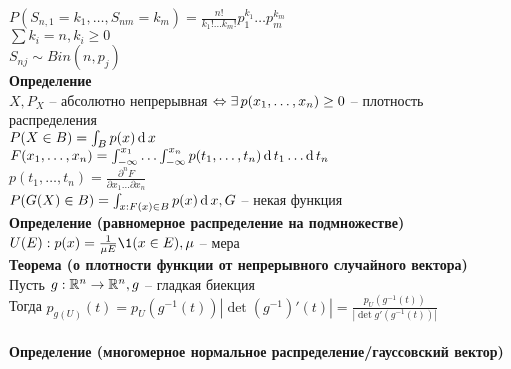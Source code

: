 \documentclass[12pt]{article}
\begin{document}
$P(S_{n,1}=k_1,\ldots, S_{nm}=k_m) = \frac{n!}{k_1!\ldots k_m!}p_1^{k_1}\ldots p_m^{k_m}$\\
$\sum k_i = n, k_i \geq 0$\\
$S_{nj} \sim Bin(n, p_j)$\\
\textbf{Определение}\\
$X, P_X$ -- абсолютно непрерывная $\Leftrightarrow \exists\, p(x_1, \ldots, x_n) \geq 0$ -- плотность распределения\\
$P(X \in B) = \int_B p(x)\operatorname{d} x$\\
$F(x_1, \ldots, x_n) = \int_{-\infty}^{x_1}\ldots \int_{-\infty}^{x_n} p(t_1, \ldots, t_n) \operatorname{d} t_1\ldots \operatorname{d} t_n$\\
$p(t_1, \ldots, t_n) = \frac{\partial^n F}{\partial x_1 \ldots \partial x_n}$\\
$P(G(X) \in B) = \int_{x:F(x)\in B} p(x)\operatorname{d} x, G$ -- некая функция\\
\textbf{Определение (равномерное распределение на подмножестве)}\\
$U(E): p(x) = \frac{1}{\mu E}\1(x\in E), \mu$ -- мера\\
\textbf{Теорема (о плотности функции от непрерывного случайного вектора)}\\
Пусть $g:\mathbb{R}^n \rightarrow \mathbb{R}^n, g$ -- гладкая биекция\\
Тогда $p_{g(U)}(t) = p_U(g^{-1}(t))|\det (g^{-1})'(t)| = \frac{p_U(g^{-1}(t))}{|\det g'(g^{-1}(t))|}$\\\\
\textbf{Определение (многомерное нормальное распределение/гауссовский вектор)}
\end{document}
